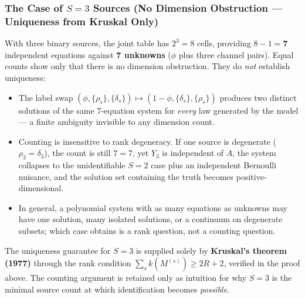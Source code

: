 \documentclass[11pt,a4paper]{article}
\begin{document}
\subsubsection{The Case of $S=3$ Sources (No Dimension Obstruction --- Uniqueness from Kruskal Only)}
With three binary sources, the joint table has $2^3 = 8$ cells, providing $8 - 1 = \textbf{7}$ independent equations against \textbf{7 unknowns} ($\phi$ plus three channel pairs). Equal counts show only that there is no dimension obstruction. They do \emph{not} establish uniqueness: %
\begin{itemize}
    \item The label swap $(\phi, \{\rho_s\}, \{\delta_s\}) \mapsto (1-\phi, \{\delta_s\}, \{\rho_s\})$ produces two distinct solutions of the same 7-equation system for \emph{every} law generated by the model --- a finite ambiguity invisible to any dimension count. %
    \item Counting is insensitive to rank degeneracy. If one source is degenerate ($\rho_3 = \delta_3$), the count is still $7 = 7$, yet $Y_3$ is independent of $A$, the system collapses to the unidentifiable $S = 2$ case plus an independent Bernoulli nuisance, and the solution set containing the truth becomes positive-dimensional. %
    \item In general, a polynomial system with as many equations as unknowns may have one solution, many isolated solutions, or a continuum on degenerate subsets; which case obtains is a rank question, not a counting question. %
\end{itemize}
The uniqueness guarantee for $S = 3$ is supplied solely by \textbf{Kruskal's theorem (1977)} through the rank condition $\sum_s k(M^{(s)}) \ge 2R + 2$, verified in the proof above. The counting argument is retained only as intuition for why $S = 3$ is the minimal source count at which identification becomes \emph{possible}. %
\end{document}
